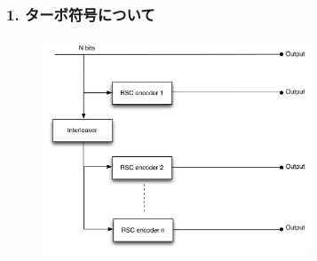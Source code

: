 \documentclass{beamer}
\begin{document}
\frame{\titlepage}


\begin{frame}

	\frametitle{1. ターボ符号について}
	\begin{figure}
		\includegraphics[width=8cm]{turboencoder.jpg}
	\end{figure}
\end{frame}
\end{document}
